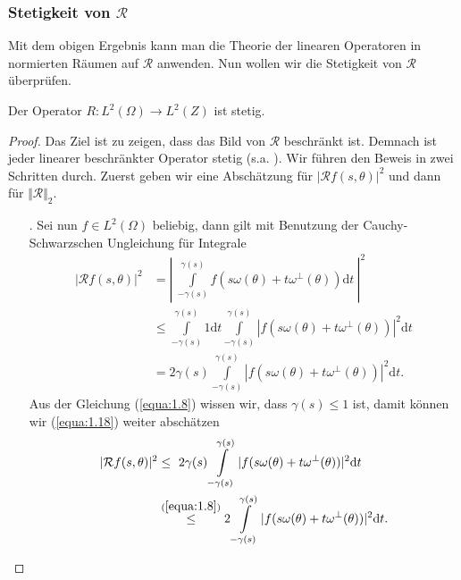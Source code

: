 \subsubsection{Stetigkeit von $\mathcal{R}$}

Mit dem obigen Ergebnis kann man die Theorie der linearen Operatoren in normierten Räumen auf $\mathcal{R}$ anwenden. Nun wollen wir die Stetigkeit von $\mathcal{R}$ überprüfen.
\begin{lemma}
	Der Operator $R : L^2(\Omega) \rightarrow L^2(Z)$ ist stetig.
	\label{lemma:1}
\end{lemma}
\begin{proof}
	Das Ziel ist zu zeigen, dass das Bild von $\mathcal{R}$ beschränkt ist. Demnach ist jeder linearer beschränkter Operator stetig (s.a. \cite[S.82]{Burg91}). Wir führen den Beweis in zwei Schritten durch. Zuerst geben wir eine Abschätzung für $|\mathcal{R} f(s,\theta)|^2$ und dann für $\Vert \mathcal{R} \Vert_2$.
	\begin{enumerate}
		\item[\lowroman{1}.] Sei nun $f \in L^2(\Omega)$ beliebig, dann gilt mit Benutzung der Cauchy-Schwarzschen Ungleichung für Integrale
		\begin{equation}
			\begin{split}
				|\mathcal{R} f(s,\theta)|^2 & = \left| \ \int\limits_{-\gamma(s)}^{\gamma(s)} f(s\omega(\theta) + t\omega^{\perp}(\theta)) \mbox{d}t \ \right|^2 \\
				& \leq \int\limits_{-\gamma(s)}^{\gamma(s)} 1 \mbox{d}t \int\limits_{-\gamma(s)}^{\gamma(s)} |f(s\omega(\theta) + t\omega^{\perp}(\theta))|^2 \mbox{d}t\\
				& = 2 \gamma(s) \int\limits_{-\gamma(s)}^{\gamma(s)} |f(s\omega(\theta) + t\omega^{\perp}(\theta))|^2 \mbox{d}t.
			\end{split}
			\label{equa:1.17}
		\end{equation}
		Aus der Gleichung (\ref{equa:1.8}) wissen wir, dass $\gamma(s) \leq 1$ ist, damit können wir (\ref{equa:1.18}) weiter abschätzen
		\begin{equation}
			\begin{split}
				|\mathcal{R} f(s,\theta)|^2 & \leq \ 2 \gamma(s) \int\limits_{-\gamma(s)}^{\gamma(s)} |f(s\omega(\theta) + t\omega^{\perp}(\theta))|^2 \mbox{d}t \\
				& \stackrel{ ( \ref{equa:1.8} ) }{\leq} 2 \int\limits_{-\gamma(s)}^{\gamma(s)} |f(s\omega(\theta) + t\omega^{\perp}(\theta))|^2 \mbox{d}t.
			\end{split}

\end{equation}
\end{enumerate}
\end{proof}
